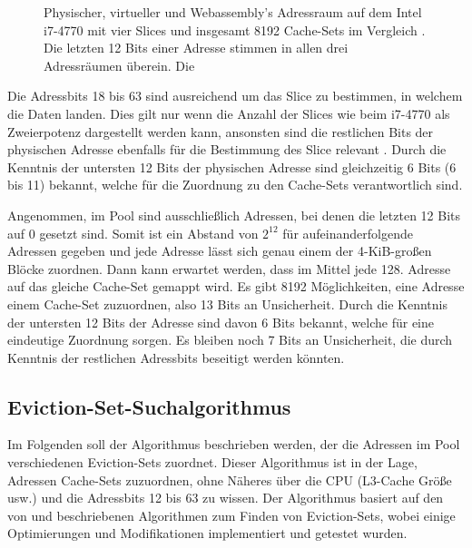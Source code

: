 \label{fig:address_layout}
\begin{figure}[h]
\centering
\begin{scaletikzpicturetowidth}{\textwidth}

\end{scaletikzpicturetowidth}
\caption{Physischer, virtueller und Webassembly's Adressraum auf dem Intel i7-4770 mit vier Slices und insgesamt 8192 Cache-Sets im Vergleich \cite{DriveByPaper}. Die letzten 12 Bits einer Adresse stimmen in allen drei Adressräumen überein. Die }
\end{figure}

Die Adressbits 18 bis 63 sind ausreichend um das Slice zu bestimmen, in welchem die Daten landen.
Dies gilt nur wenn die Anzahl der Slices wie beim i7-4770 als Zweierpotenz dargestellt werden kann, ansonsten sind die restlichen Bits der physischen Adresse ebenfalls für die Bestimmung des Slice relevant \cite{RSAITSCHES2016}. 
Durch die Kenntnis der untersten 12 Bits der physischen Adresse sind gleichzeitig 6 Bits (6 bis 11) bekannt, welche für die Zuordnung zu den Cache-Sets verantwortlich sind.

Angenommen, im Pool sind ausschließlich Adressen, bei denen die letzten 12 Bits auf 0 gesetzt sind. 
Somit ist ein Abstand von $2^{12}$ für aufeinanderfolgende Adressen gegeben und jede Adresse lässt sich genau einem der 4-KiB-großen Blöcke zuordnen.
Dann kann erwartet werden, dass im Mittel jede 128. 
Adresse auf das gleiche Cache-Set gemappt wird. Es gibt 8192 Möglichkeiten, eine Adresse einem Cache-Set zuzuordnen, also 13 Bits an Unsicherheit.
Durch die Kenntnis der untersten 12 Bits der Adresse sind davon 6 Bits bekannt, welche für eine eindeutige Zuordnung sorgen. 
Es bleiben noch 7 Bits an Unsicherheit, die durch Kenntnis der restlichen Adressbits beseitigt werden könnten.

\subsection{Eviction-Set-Suchalgorithmus}
\label{evictionSetSearchAlgo}

Im Folgenden soll der Algorithmus beschrieben werden, der die Adressen im Pool verschiedenen Eviction-Sets zuordnet.
Dieser Algorithmus ist in der Lage, Adressen Cache-Sets zuzuordnen, ohne Näheres über die CPU (L3-Cache Größe usw.) und die Adressbits 12 bis 63 zu wissen.
Der Algorithmus basiert auf den von \cite{DriveByPaper} und \cite{PrimeAndAbort} beschriebenen Algorithmen zum Finden von Eviction-Sets, wobei einige Optimierungen und Modifikationen implementiert und getestet wurden.

